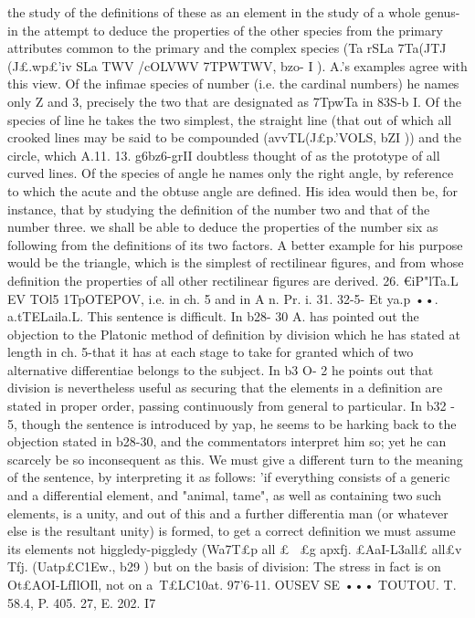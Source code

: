 {{{{{{{{{{{{{{{{{{{{{{{{{{{{{{{{{{{{{{{{{{{{{{{{{{{{{{{{{{{{{{{{{{the study of the definitions of these as an element in the study
of a whole genus-in the attempt to deduce the properties of the
other species from the primary attributes common to the primary
and the complex species (Ta rSLa 7Ta(JTJ (J£.wp£'iv SLa TWV /cOLVWV
7TPWTWV, bzo- I ). A.'s examples agree with this view. Of the
infimae species of number (i.e. the cardinal numbers) he names
only Z and 3, precisely the two that are designated as 7TpwTa
in 83S-b I. Of the species of line he takes the two simplest, the
straight line (that out of which all crooked lines may be said to
be compounded (avvTL(J£p.'VOLS, bZI )) and the circle, which A.11. 13. g6bz6-grII
doubtless thought of as the prototype of all curved lines. Of the
species of angle he names only the right angle, by reference to
which the acute and the obtuse angle are defined. His idea would
then be, for instance, that by studying the definition of the
number two and that of the number three. we shall be able to
deduce the properties of the number six as following from the
definitions of its two factors. A better example for his purpose
would be the triangle, which is the simplest of rectilinear figures,
and from whose definition the properties of all other rectilinear
figures are derived.
26. €iP"lTa.L EV TOl5 1TpOTEPOV, i.e. in ch. 5 and in A n. Pr. i. 31.
32-5- Et ya.p ••. a.tTELaila.L. This sentence is difficult. In b28-
30 A. has pointed out the objection to the Platonic method of
definition by division which he has stated at length in ch. 5-that
it has at each stage to take for granted which of two alternative
differentiae belongs to the subject. In b3 O- 2 he points out that
division is nevertheless useful as securing that the elements in
a definition are stated in proper order, passing continuously from
general to particular. In b32 - 5, though the sentence is introduced
by yap, he seems to be harking back to the objection stated in
b28-30, and the commentators interpret him so; yet he can
scarcely be so inconsequent as this. We must give a different
turn to the meaning of the sentence, by interpreting it as follows:
'if everything consists of a generic and a differential element,
and "animal, tame", as well as containing two such elements, is
a unity, and out of this and a further differentia man (or whatever
else is the resultant unity) is formed, to get a correct definition
we must assume its elements not higgledy-piggledy (Wa7T£p all
£~ £g apxfj. £AaI-L{3all£
all£v Tfj. (Uatp£C1Ew., b29 ) but on the basis
of division: The stress in fact is on Ot£AOI-LfIlOIl, not on a~T£LC10at.
97'6-11. OUSEV SE ••• TOUTOU. T. 58.4, P. 405. 27, E. 202. I7
}}}}}}}}}}}}}}}}}}}}}}}}}}}}}}}}}}}}}}}}}}}}}}}}}}}}}}}}}}}}}}}}}}}
